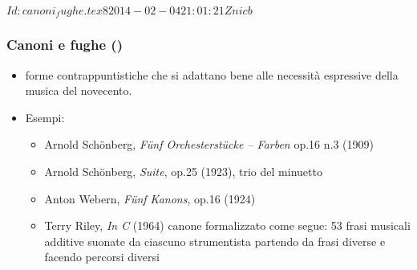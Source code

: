 %
%
\svnInfo $Id: canoni_fughe.tex 8 2014-02-04 21:01:21Z nicb $

\setcounter{ms}{0}
\begin{frame}
    \frametitle{Canoni e fughe ()}

    \begin{itemize}

        \item forme contrappuntistiche che si adattano bene alle necessit\`a
              espressive della musica del novecento.

        \item Esempi:

            \begin{itemize}

                \item Arnold Sch\"onberg, \emph{F\"unf Orchesterst\"ucke -- Farben} op.16 n.3 (1909)

                \item Arnold Sch\"onberg, \emph{Suite}, op.25 (1923), trio del minuetto

                \item Anton Webern, \emph{F\"unf Kanons}, op.16 (1924)

                \item Terry Riley, \emph{In C} (1964)
                      canone formalizzato come segue:
                      53 frasi musicali additive suonate da
                      ciascuno strumentista partendo da frasi
                      diverse e facendo percorsi diversi

            \end{itemize}

    \end{itemize}

\end{frame}

